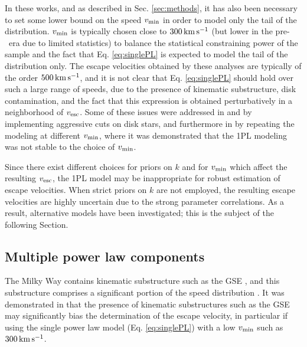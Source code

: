 In these works, and as described in Sec. \ref{sec:methods}, it has also been necessary to set some lower bound on the speed $v_{\rm{min}}$ in order to model only the tail of the distribution. $v_{\rm{min}}$ is typically chosen close to $300\,\rm{km\,s^{-1}}$ (but lower in the pre-\Gaia~era due to limited statistics) to balance the statistical constraining power of the sample and the fact that Eq. \ref{eq:singlePL} is expected to model the tail of the distribution only. The escape velocities obtained by these analyses are typically of the order $500\,\rm{km\,s^{-1}}$, and it is not clear that Eq. \ref{eq:singlePL} should hold over such a large range of speeds, due to the presence of kinematic substructure, disk contamination, and the fact that this expression is obtained perturbatively in a neighborhood of $v_{\rm{esc}}$. Some of these issues were  addressed in \cite{Koppelman2021} and \cite{Necib2022} by implementing aggressive cuts on disk stars, and furthermore in \cite{Necib2022} by repeating the modeling at different $v_{\rm{min}}$, where it was demonstrated that the 1PL modeling was not stable to the choice of $v_{\rm{min}}$. 

Since there exist different choices for priors on $k$ and for $v_{\rm{min}}$ which affect the resulting $v_{\rm{esc}}$, the 1PL model may be inappropriate for robust estimation of escape velocities. When strict priors on $k$ are not employed, the resulting escape velocities are highly uncertain due to the strong parameter correlations. As a result, alternative models have been investigated; this is the subject of the following Section.

\subsection{Multiple power law components}
\label{sec:mpl}

The Milky Way contains kinematic substructure such as the GSE \citep{2018Natur.563...85H,2018MNRAS.478..611B}, and this substructure comprises a significant portion of the speed distribution \citep{Necib:2019a}. It was demonstrated in \cite{grand:2019,Necib2022methods} that the presence of kinematic substructures such as the GSE may significantly bias the determination of the escape velocity, in particular if using the single power law model (Eq. \ref{eq:singlePL}) with a low $v_{\rm{min}}$ such as $300\,\rm{km\,s^{-1}}$. 

